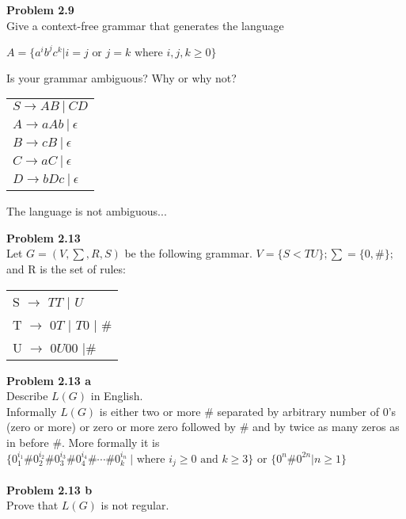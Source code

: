 \documentclass{article}
\newcommand{\problem}[1]{\large{\textbf{Problem #1} \\}}
\begin{document}
\problem{2.9}
Give a context-free grammar that generates the language
\begin{center}
$A = \{a^i b^j c^k | i = j \text{ or } j = k \text{ where } i,j,k \geq 0\}$
\end{center}
Is your grammar ambiguous? Why or why not?

\begin{table}[h!]
\centering
\begin{tabular}{l}
$S \rightarrow A B\: | \: C D $\\
$A \rightarrow aAb \: | \: \epsilon $\\
$B \rightarrow cB \: | \: \epsilon $\\
$C \rightarrow aC \: | \: \epsilon $\\
$D \rightarrow bDc \:| \: \epsilon $\\
\end{tabular}
\end{table}

The language is not ambiguous... \\

\pagebreak

\problem{2.13}
Let $G = (V, \sum, R, S)$ be the following grammar. $V = \{S<T U\}; \sum = \{0,\#\};$ and R is the set of rules:
\begin{table}[h!]
\centering
\begin{tabular}{l}
S $\rightarrow$ $TT$ $|$ $U$ \\
T $\rightarrow$ $0T$ $|$ $T0$ $|$ $\#$   \\
U $\rightarrow$  $0U00$ $|\#$
\end{tabular}
\end{table}

\vspace{0.2cm}

\problem{2.13 a}
Describe $L(G)$ in English. \\

Informally $L(G)$ is either two or more $\#$ separated by arbitrary number of 0's (zero or more)
or zero or more zero followed by $\#$ and by twice as many zeros as in before $\#$. 
More formally it is $\{0^{i_1}_1\#0^{i_2}_2\#0^{i_3}_3\#0^{i_4}_4\#\cdots\#0^{i_n}_k\ |
\text{ where } i_j \geq 0 \text{ and } k \geq 3 \}$ or $\{0^n \# 0^{2n} | n \geq 1\}$ \\ \\

\problem{2.13 b}
Prove that $L(G)$ is not regular. \\
\end{document}
